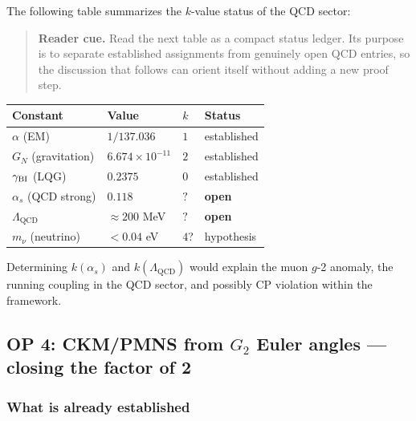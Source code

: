 \begin{remark}
\label{rem:k-qcd}
The following table summarizes the $k$-value status of the QCD sector:
\begin{quote}\small
\noindent\textbf{Reader cue.} Read the next table as a compact status ledger. Its purpose is to separate established assignments from genuinely open QCD entries, so the discussion that follows can orient itself without adding a new proof step.
\end{quote}
\begin{center}
\renewcommand{\arraystretch}{1.3}
\begin{tabular}{llll}
\toprule
Constant & Value & $k$ & Status \\
\midrule
$\alpha$ (EM)    & $1/137.036$ & $1$ & established \\
$G_N$ (gravitation) & $6.674\times10^{-11}$ & $2$ & established \\
$\gamma_{\mathrm{BI}}$ (LQG)     & $0.2375$    & $0$ & established \\
$\alpha_s$ (QCD strong) & $0.118$ & $?$ & \textbf{open} \\
$\Lambda_{\mathrm{QCD}}$ & $\approx 200$ MeV & $?$ & \textbf{open} \\
$m_\nu$ (neutrino)  & $< 0.04$ eV & $4$? & hypothesis \\
\bottomrule
\end{tabular}
\end{center}
Determining $k(\alpha_s)$ and $k(\Lambda_{\mathrm{QCD}})$ would explain
the muon $g$-2 anomaly, the running coupling in the QCD sector, and
possibly CP violation within the framework.
\end{remark}





\subsection{OP 4: CKM/PMNS from \texorpdfstring{$G_2$}{G2}
  Euler angles — closing the factor of 2}
\label{sec:op4}

\subsubsection{What is already established}

